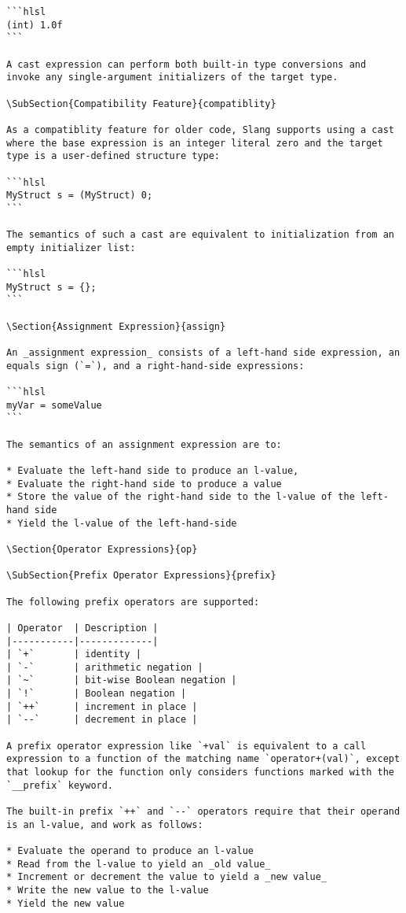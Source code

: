 \begin{verbatim}
```hlsl
(int) 1.0f
```

A cast expression can perform both built-in type conversions and invoke any single-argument initializers of the target type.

\SubSection{Compatibility Feature}{compatiblity}

As a compatiblity feature for older code, Slang supports using a cast where the base expression is an integer literal zero and the target type is a user-defined structure type:

```hlsl
MyStruct s = (MyStruct) 0;
```

The semantics of such a cast are equivalent to initialization from an empty initializer list:

```hlsl
MyStruct s = {};
```

\Section{Assignment Expression}{assign}

An _assignment expression_ consists of a left-hand side expression, an equals sign (`=`), and a right-hand-side expressions:

```hlsl
myVar = someValue
```

The semantics of an assignment expression are to:

* Evaluate the left-hand side to produce an l-value,
* Evaluate the right-hand side to produce a value
* Store the value of the right-hand side to the l-value of the left-hand side
* Yield the l-value of the left-hand-side

\Section{Operator Expressions}{op}

\SubSection{Prefix Operator Expressions}{prefix}

The following prefix operators are supported:

| Operator 	| Description |
|-----------|-------------|
| `+`		| identity |
| `-`		| arithmetic negation |
| `~` 		| bit-wise Boolean negation |
| `!`		| Boolean negation |
| `++`		| increment in place |
| `--`		| decrement in place |

A prefix operator expression like `+val` is equivalent to a call expression to a function of the matching name `operator+(val)`, except that lookup for the function only considers functions marked with the `__prefix` keyword.

The built-in prefix `++` and `--` operators require that their operand is an l-value, and work as follows:

* Evaluate the operand to produce an l-value
* Read from the l-value to yield an _old value_
* Increment or decrement the value to yield a _new value_
* Write the new value to the l-value
* Yield the new value


\end{verbatim}
